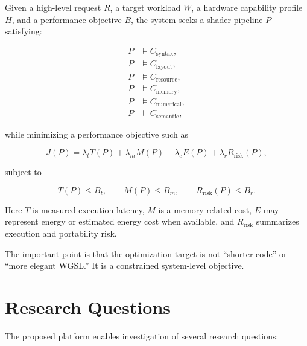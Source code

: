 \documentclass[11pt,a4paper,oneside]{report}
\begin{document}
Given a high-level request $R$, a target workload $W$, a hardware capability profile $H$, and a
performance objective $B$, the system seeks a shader pipeline $P$ satisfying:

\begin{align}
P &\models C_{\mathrm{syntax}},\\
P &\models C_{\mathrm{layout}},\\
P &\models C_{\mathrm{resource}},\\
P &\models C_{\mathrm{memory}},\\
P &\models C_{\mathrm{numerical}},\\
P &\models C_{\mathrm{semantic}},
\end{align}

while minimizing a performance objective such as

\begin{equation}
J(P)=
\lambda_t T(P)+
\lambda_m M(P)+
\lambda_e E(P)+
\lambda_r R_{\mathrm{risk}}(P),
\end{equation}

subject to

\begin{equation}
T(P)\le B_t,
\qquad
M(P)\le B_m,
\qquad
R_{\mathrm{risk}}(P)\le B_r.
\end{equation}

Here $T$ is measured execution latency, $M$ is a memory-related cost,
$E$ may represent energy or estimated energy cost when available, and
$R_{\mathrm{risk}}$ summarizes execution and portability risk.

The important point is that the optimization target is not ``shorter code'' or ``more elegant
WGSL.'' It is a constrained system-level objective.

\section{Research Questions}

The proposed platform enables investigation of several research questions:
\end{document}
